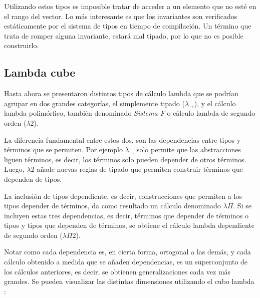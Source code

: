 \documentclass[]{report}
\begin{document}
	Utilizando estos tipos es imposible tratar de acceder a un elemento que no esté en el rango del vector.
	Lo más interesante es que los invariantes son verificados estáticamente por el sistema de tipos en tiempo de compilación.
	Un término que trata de romper alguna invariante, estará mal tipado, por lo que no es posible construirlo.

	
	\subsection{Lambda cube}
	Hasta ahora se presentaron distintos tipos de cálculo lambda que se podrían agrupar en dos grandes categorías, el simplemente tipado ($\lambda_{\to}$), y el cálculo lambda polimórfico, también denominado \textit{Sistema F} o cálculo lambda de segundo orden ($\lambda 2$).
	
	La diferencia fundamental entre estos dos, son las dependencias entre tipos y términos que se permiten.
	Por ejemplo $\lambda_{\to}$ solo permite que las abstracciones liguen términos, es decir, los términos solo pueden depender de otros términos.
	Luego, $\lambda 2$ añade nuevas reglas de tipado que permiten construir términos que dependen de tipos.
	
	La inclusión de tipos dependiente, es decir, construcciones que permiten a los tipos depender de términos, da como resultado un cálculo denominado $\lambda\Pi$.
	Si se incluyen estas tres dependencias, es decir, términos que depender de términos o tipos y tipos que dependen de términos, se obtiene el cálculo lambda dependiente de segundo orden ($\lambda\Pi 2$).
	
	Notar como cada dependencia es, en cierta forma, ortogonal a las demás, y cada cálculo obtenido a medida que se añaden dependencias, es un superconjunto de los cálculos anteriores, es decir, se obtienen generalizaciones cada vez más grandes.
	Se pueden visualizar las distintas dimensiones utilizando el cubo lambda \cite{lambda_cube}:
	
\end{document}

